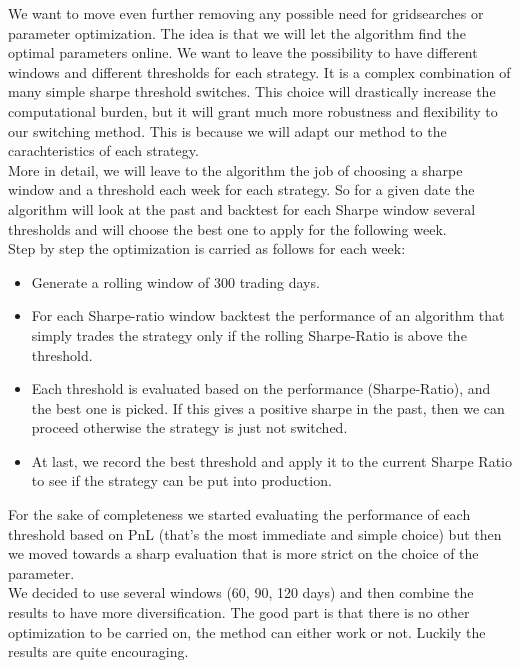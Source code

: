 We want to move even further removing any possible need for gridsearches or parameter optimization. The idea is that we will let the algorithm find the optimal parameters online. We want to leave the possibility to have different windows and different thresholds for each strategy. It is a complex combination of many simple sharpe threshold switches. This choice will drastically increase the computational burden, but it will grant much more robustness and flexibility to our switching method. This is because we will adapt our method to the carachteristics of each strategy.\\
More in detail, we will leave to the algorithm the job of choosing a sharpe window and a threshold each week for each strategy. So for a given date the algorithm will look at the past and backtest for each Sharpe window several thresholds and will choose the best one to apply for the following week.\\
Step by step the optimization is carried as follows for each week:
\begin{itemize}
	\item Generate a rolling window of 300 trading days.
	\item For each Sharpe-ratio window backtest the performance of an algorithm that simply trades the strategy only if the rolling Sharpe-Ratio is above the threshold.
	\item Each threshold is evaluated based on the performance (Sharpe-Ratio), and the best one is picked. If this gives a positive sharpe in the past, then we can proceed otherwise the strategy is just not switched.
	\item At last, we record the best threshold and apply it to the current Sharpe Ratio to see if the strategy can be put into production.
\end{itemize}

For the sake of completeness we started evaluating the performance of each threshold based on PnL (that's the most immediate and simple choice) but then we moved towards a sharp evaluation that is more strict on the choice of the parameter.\\
We decided to use several windows (60, 90, 120 days) and then combine the results to have more diversification. The good part is that there is no other optimization to be carried on, the method can either work or not. Luckily the results are quite encouraging.